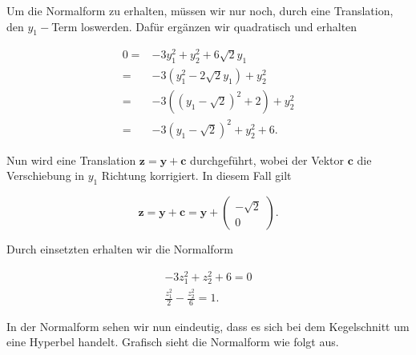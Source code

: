 Um die Normalform zu erhalten, müssen wir nur noch, durch eine Translation, den \( y_1-\)Term loswerden. Dafür ergänzen wir quadratisch und erhalten

\begin{equation*}
    \begin{aligned}
        0 = & -3y_1^2 + y_2^2 + 6 \sqrt{2} y_1 \\[0.5em]
        = & -3 \left( y_1^2 - 2\sqrt{2} y_1 \right) + y_2^2 \\[0.5em]
        = & -3 \left( \left(y_1 - \sqrt{2}\right)^2 + 2 \right) + y_2^2 \\[0.5em]
        = & -3 \left(y_1 - \sqrt{2}\right)^2 + y_2^2 + 6.
    \end{aligned}
\end{equation*}

Nun wird eine Translation \( \mathbf{z} = \mathbf{y} + \mathbf{c} \) durchgeführt, wobei der Vektor \( \mathbf{c} \) die Verschiebung in \( y_1 \) Richtung korrigiert. In diesem Fall gilt

\begin{equation*}
    \mathbf{z} = \mathbf{y} + \mathbf{c} = \mathbf{y} + \begin{pmatrix} - \sqrt{2} \\ 0 \end{pmatrix}.
\end{equation*}

Durch einsetzten erhalten wir die Normalform

\begin{equation*}
    \begin{aligned}
        -3z_1^2 + z_2^2 + 6 = 0 \\[0.5em]
        \frac{z_1^2}{2} - \frac{z_2^2}{6} = 1.
    \end{aligned}
\end{equation*}

In der Normalform sehen wir nun eindeutig, dass es sich bei dem Kegelschnitt um eine Hyperbel handelt. Grafisch sieht die Normalform wie folgt aus.

